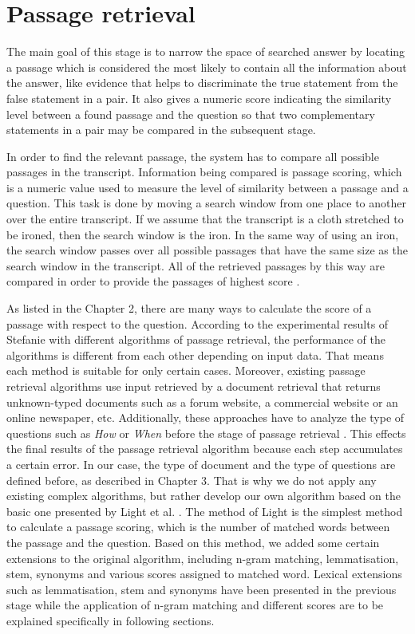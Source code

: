 \section{Passage retrieval} 


The main goal of this stage is to narrow the space of searched answer by locating a passage which is considered the most likely to contain all the information about the answer, like evidence that helps to discriminate the true statement from the false statement in a pair. It also gives a numeric score indicating the similarity level between a found passage and the question so that two complementary statements in a pair may be compared in the subsequent stage.

In order to find the relevant passage, the system has to compare all possible passages in the transcript. Information being compared is passage scoring, which is a numeric value used to measure the level of similarity between a passage and a question. This task is done by moving a search window from one place to another over the entire transcript. If we assume that the transcript is a cloth stretched to be ironed, then the search window is the iron. In the same way of using an iron, the search window passes over all possible passages that have the same size as the search window in the transcript. All of the retrieved passages by this way are compared in order to provide the passages of highest score \cite{lequocanh}. 

As listed in the Chapter 2, there are many ways to calculate the score of a passage with respect to the question. According to the experimental results of Stefanie \cite{tellex2003qep} with different algorithms of passage retrieval, the performance of the algorithms is different from each other depending on input data. That means each method is suitable for only certain cases. Moreover, existing passage retrieval algorithms use input retrieved by a document retrieval that returns unknown-typed documents such as a forum website, a commercial website or an online newspaper, etc. Additionally, these approaches have to analyze the type of questions such as \textit{How} or \textit{When} before the stage of passage retrieval  \cite{TREC8, TREC2001, hirschman2002nlq, tellex2003qep}. This effects the final results of the passage retrieval algorithm because each step accumulates a certain error. In our case, the type of document and the type of questions are defined before, as described in Chapter 3. That is why we do not apply any existing complex algorithms, but rather develop our own algorithm based on the basic one presented by Light et al. \cite{light2002aec}. The method of Light is the simplest method to calculate a passage scoring, which is the number of matched words between the passage and the question. Based on this method, we added some certain extensions to the original algorithm, including n-gram matching, lemmatisation, stem, synonyms and various scores assigned to matched word. Lexical extensions such as lemmatisation, stem and synonyms have been presented in the previous stage while the application of n-gram matching and different scores are to be explained specifically in following sections.

